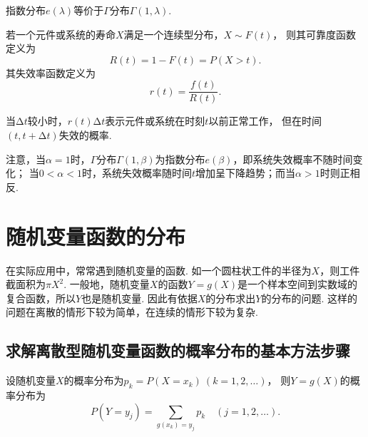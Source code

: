指数分布\(e(\lambda)\)等价于\(\Gamma\)分布\(\Gamma(1,\lambda)\).

\begin{definition}
若一个元件或系统的寿命\(X\)满足一个连续型分布，\(X \sim F(t)\)，
则其可靠度函数定义为\[
R(t) = 1 - F(t) = P(X > t).
\]其失效率函数定义为\[
r(t) = \frac{f(t)}{R(t)}.
\]

当\(\increment t\)较小时，\(r(t) \increment t\)表示元件或系统在时刻\(t\)以前正常工作，
但在时间\((t,t+\increment t)\)失效的概率.
\end{definition}

注意，当\(\alpha = 1\)时，\(\Gamma\)分布\(\Gamma(1,\beta)\)为指数分布\(e(\beta)\)，即系统失效概率不随时间变化；
当\(0 < \alpha < 1\)时，系统失效概率随时间\(t\)增加呈下降趋势；而当\(\alpha > 1\)时则正相反.

\section{随机变量函数的分布}
在实际应用中，常常遇到随机变量的函数.
如一个圆柱状工件的半径为\(X\)，则工件截面积为\(\pi X^2\).
一般地，随机变量\(X\)的函数\(Y=g(X)\)是一个样本空间到实数域的复合函数，所以\(Y\)也是随机变量.
因此有依据\(X\)的分布求出\(Y\)的分布的问题.
这样的问题在离散的情形下较为简单，在连续的情形下较为复杂.

\subsection{求解离散型随机变量函数的概率分布的基本方法步骤}
设随机变量\(X\)的概率分布为\(p_k = P(X = x_k)\ (k=1,2,\dotsc)\)，
则\(Y = g(X)\)的概率分布为\[
P(Y = y_j) = \sum\limits_{g(x_k) = y_j} p_k
\quad(j=1,2,\dotsc).
\]

